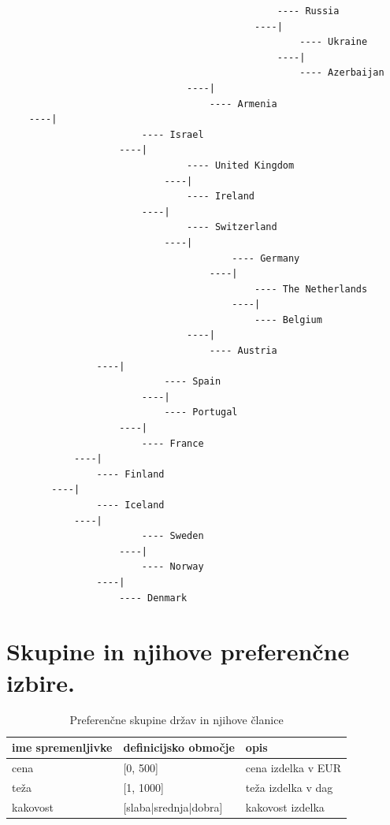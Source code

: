 \documentclass[a4paper,11pt]{article}
\begin{document}
\begin{lstlisting}
                                                ---- Russia
                                            ----|
                                                    ---- Ukraine
                                                ----|
                                                    ---- Azerbaijan
                                ----|
                                    ---- Armenia
    ----|
                        ---- Israel
                    ----|
                                ---- United Kingdom
                            ----|
                                ---- Ireland
                        ----|
                                ---- Switzerland
                            ----|
                                        ---- Germany
                                    ----|
                                            ---- The Netherlands
                                        ----|
                                            ---- Belgium
                                ----|
                                    ---- Austria
                ----|
                            ---- Spain
                        ----|
                            ---- Portugal
                    ----|
                        ---- France
            ----|
                ---- Finland
        ----|
                ---- Iceland
            ----|
                        ---- Sweden
                    ----|
                        ---- Norway
                ----|
                    ---- Denmark
\end{lstlisting}


\section{Skupine in njihove preferenčne izbire.}

\begin{table}[htbp]
\caption{Preferenčne skupine držav in njihove članice}
\label{tab1}
\begin{center}
\begin{tabular}{llp{3cm}}
\hline
ime spremenljivke & definicijsko območje & opis \\
\hline
cena & [0, 500] & cena izdelka v EUR\\
teža & [1, 1000] & teža izdelka v dag \\
kakovost & [slaba|srednja|dobra] & kakovost izdelka \\
\hline
\end{tabular}
\end{center}
\end{table}
\end{document}
